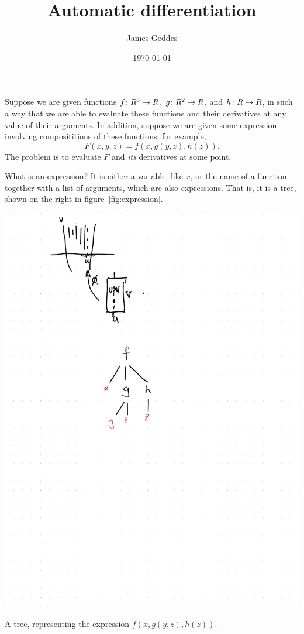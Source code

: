 \documentclass[11pt, a4paper]{article}
\title{Automatic differentiation}
\author{James Geddes}
\date{\today}
\newcommand{\set}[1]{\boldmath{#1}}
\newcommand{\setR}{\set{R}}
\begin{document}
\maketitle

Suppose we are given functions $f\colon \setR^3 \to \setR$,
$g\colon \setR^2\to\setR$, and $h\colon \setR\to\setR$, in such a way that
we are able to evaluate these functions and their derivatives at any
value of their arguments. In addition, suppose we are given some
expression involving composititions of these functions; for example,
\begin{equation}
  F(x, y, z) = f(x, g(y, z), h(z)).
\label{eq:example}\end{equation}
The problem is to evaluate $F$ and \emph{its} derivatives at some
point.

What is an expression? It is either a variable, like $x$, or the name
of a function together with a list of arguments, which are also
expressions. That is, it is a tree, shown on the right in
figure~\ref{fig:expression}.
\begin{marginfigure}
  \centering
  \includegraphics{images/expression.pdf}
  \caption{A tree, representing the expression $f(x, g(y, z), h(z))$.\label{fig:expression}}
\end{marginfigure}
\end{document}
